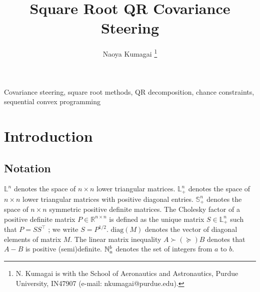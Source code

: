 \documentclass{IEEEtran}
\title{Square Root QR Covariance Steering}
\author{Naoya Kumagai
\thanks{N. Kumagai is with the School of Aeronautics and Astronautics, Purdue University, IN47907 (e-mail: nkumagai@purdue.edu).}}
\begin{document}
\maketitle

\begin{abstract}

\end{abstract}

\begin{IEEEkeywords}
Covariance steering, square root methods, QR decomposition, chance constraints, sequential convex programming
\end{IEEEkeywords}

\section{Introduction}

\subsection{Notation}
$\mathbb{L}^n$ denotes the space of $n \times n$ lower triangular matrices.
$\mathbb{L}_+^n$ denotes the space of $n \times n$ lower triangular matrices with positive diagonal entries. $\mathbb{S}^n_+$ denotes the space of $n \times n$ symmetric positive definite matrices. The Cholesky factor of a positive definite matrix \( P \in \mathbb{R}^{n \times n} \) is defined as the unique matrix \( S \in \mathbb{L}_+^n \) such that \( P = S S^\top \) \cite[Theorem 4.2.7]{golubMatrixComputations2013}; we write \(S = P^{1/2}\). $\mathrm{diag}(M)$ denotes the vector of diagonal elements of matrix \( M \). The linear matrix inequality $A \succ (\succeq) B$ denotes that $A - B $ is positive (semi)definite. \(\mathbb{N}_{a}^{b}\) denotes the set of integers from \( a \) to \( b \).
\end{document}
